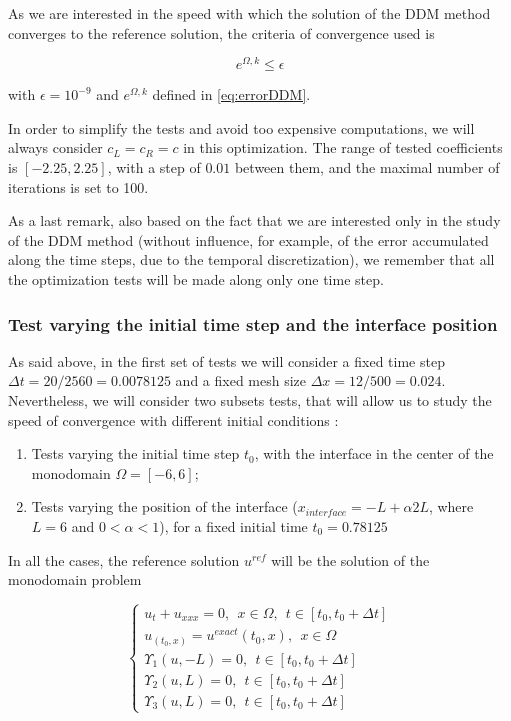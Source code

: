 \indent As we are interested in the speed with which the solution of the DDM method converges to the reference solution, the criteria of convergence used is

\begin{equation}
\label{eq:criteriaConvergence}
	e^{\Omega,k} \leq \epsilon
\end{equation}

\noindent with $\epsilon = 10^{-9}$ and $e^{\Omega,k}$ defined in \eqref{eq:errorDDM}.
 
\indent In order to simplify the tests and avoid too expensive computations, we will always consider $c_L = c_R = c$ in this optimization. The range of tested coefficients is $[-2.25,2.25]$, with a step of $0.01$ between them, and the maximal number of iterations is set to 100.

\indent As a last remark, also based on the fact that we are interested only in the study of the DDM method (without influence, for example, of the error accumulated along the time steps, due to the temporal discretization), we remember that all the optimization tests will be made along only one time step.

\subsubsection{Test varying the initial time step and the interface position}

\indent As said above, in the first set of tests we will consider a fixed time step $\Delta t = 20/2560 = 0.0078125$ and a fixed mesh size $\Delta x = 12/500 = 0.024$. Nevertheless, we will consider two subsets tests, that will allow us to study the speed of convergence with different initial conditions :

\begin{enumerate}
	\item Tests varying the initial time step $t_0$, with the interface in the center of the monodomain $\Omega = [-6,6]$;
	\item Tests varying the position of the interface ($x_{interface} = -L + \alpha 2L$, where $L = 6$ and $0 < \alpha < 1$), for a fixed initial time $t_0 = 0.78125$
\end{enumerate}

\indent In all the cases, the reference solution $u^{ref}$ will be the solution of the monodomain problem

\begin{equation*}
	\begin{cases}
	u_t + u_{xxx} = 0, \ \ x \in \Omega, \ \ t \in [t_0, t_0+\Delta t] \\
	u_(t_0,x) = u^{exact}(t_0,x) , \ \ x \in \Omega \\ 
	\Upsilon_1(u,-L) = 0, \ \ t \in [t_0, t_0+\Delta t] \\
	\Upsilon_2(u,L) = 0, \ \ t \in [t_0, t_0+\Delta t] \\
	\Upsilon_3(u,L) = 0, \ \ t \in [t_0, t_0+\Delta t]
	\end{cases}
\end{equation*}

